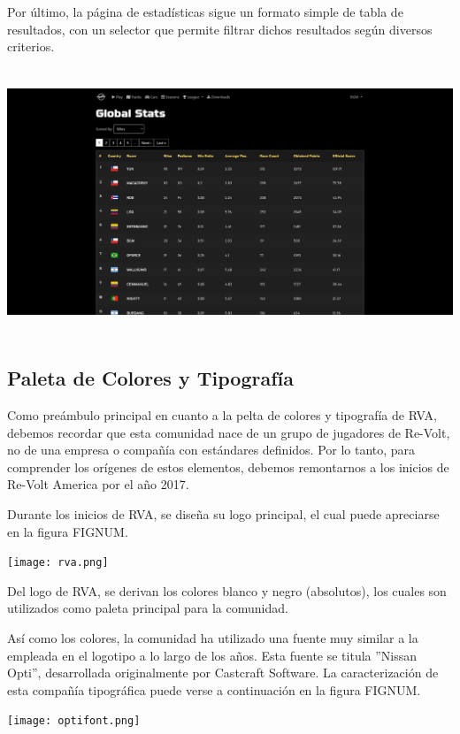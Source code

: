 Por último, la página de estadísticas sigue un formato simple de tabla de resultados, con un selector que permite filtrar dichos resultados según diversos criterios.

\includegraphics[width=15cm, height=8cm]{img/stats.png} \\

\subsection{Paleta de Colores y Tipografía}
Como preámbulo principal en cuanto a la pelta de colores y tipografía de RVA, debemos recordar que esta comunidad nace de un grupo de jugadores de Re-Volt, no de una empresa o compañía con estándares definidos. Por lo tanto, para comprender los orígenes de estos elementos, debemos remontarnos a los inicios de Re-Volt America por el año 2017.

Durante los inicios de RVA, se diseña su logo principal, el cual puede apreciarse en la figura FIGNUM.

\begin{center}
  \texttt{[image: rva.png]}
\end{center}

Del logo de RVA, se derivan los colores blanco y negro (absolutos), los cuales son utilizados como paleta principal para la comunidad.

Así como los colores, la comunidad ha utilizado una fuente muy similar a la empleada en el logotipo a lo largo de los años. Esta fuente se titula ''Nissan Opti'', desarrollada originalmente por Castcraft Software. La caracterización de esta compañía tipográfica puede verse a continuación en la figura FIGNUM.

\begin{center}
  \texttt{[image: optifont.png]}
\end{center}


